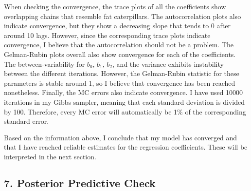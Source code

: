 \documentclass[
]{article}
\begin{document}
When checking the convergence, the trace plots of all the coefficients
show overlapping chains that resemble fat caterpillars. The
autocorrelation plots also indicate convergence, but they show a
decreasing slope that tends to 0 after around 10 lags. However, since
the corresponding trace plots indicate convergence, I believe that the
autocorrelation should not be a problem. The Gelman-Rubin plots overall
also show convergence for each of the coefficients. The
between-variability for \(b_0\), \(b_1\), \(b_2\), and the variance
exhibits instability between the different iterations. However, the
Gelman-Rubin statistic for these parameters is stable around 1, so I
believe that convergence has been reached nonetheless. Finally, the MC
errors also indicate convergence. I have used 10000 iterations in my
Gibbs sampler, meaning that each standard deviation is divided by 100.
Therefore, every MC error will automatically be 1\% of the corresponding
standard error.

Based on the information above, I conclude that my model has converged
and that I have reached reliable estimates for the regression
coefficients. These will be interpreted in the next section.

\hypertarget{posterior-predictive-check}{%
\subsection{7. Posterior Predictive
Check}\label{posterior-predictive-check}}
\end{document}
